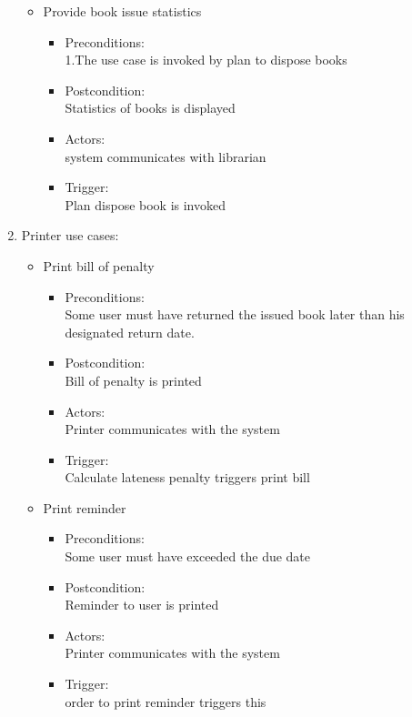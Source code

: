 \documentclass{article}
\begin{document}
\begin{enumerate}
\begin{itemize}
 \item Provide book issue statistics
	\begin{itemize}
	\item  Preconditions:\\ 1.The use case is invoked by plan to dispose books\\ 
 \item Postcondition:\\ Statistics of books is displayed\\ 
 \item Actors: \\ system communicates with librarian\\ 
 \item Trigger:\\ Plan dispose book is invoked\\ 
	\end{itemize}

 \end{itemize}
\item Printer use cases:\\ 
\begin{itemize}
\item Print bill of penalty\\ 
\begin{itemize}
\item Preconditions:\\ Some user must have returned the issued book later than his designated return date.\\ 
 \item Postcondition:\\ Bill of penalty is printed\\ 
 \item Actors:\\  Printer communicates with the system\\ 
 \item Trigger:\\  Calculate lateness penalty triggers print bill\\ 
\end{itemize}

\item Print reminder\\ 
\begin{itemize}
\item  Preconditions:\\ Some user must have exceeded the due date\\ 
 \item Postcondition:\\ Reminder to user is printed\\ 
 \item Actors:\\  Printer communicates with the system\\ 
 \item Trigger:\\ order to print reminder triggers this\\ 
\end{itemize}


\end{itemize}
\end{enumerate}
\end{document}
